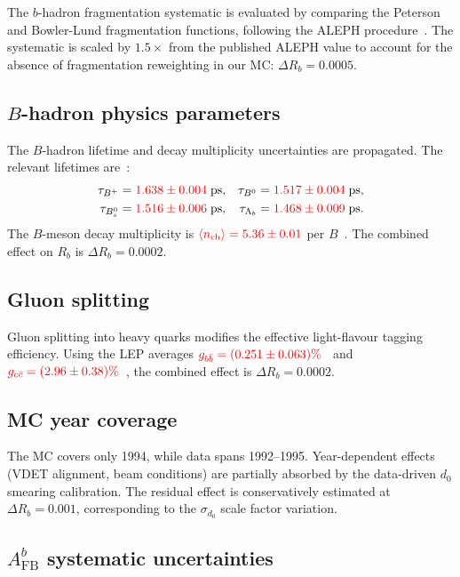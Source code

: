 \documentclass[11pt,a4paper]{article}
\newcommand{\external}[1]{\textcolor{red}{#1}}
\begin{document}
The $b$-hadron fragmentation systematic is evaluated by comparing
the Peterson and Bowler-Lund fragmentation functions, following
the ALEPH procedure~\cite{ALEPH:Rb:1996}.
The systematic is scaled by $1.5\times$ from the published ALEPH
value to account for the absence of fragmentation reweighting in
our MC: $\Delta R_b = 0.0005$.

\subsection{$B$-hadron physics parameters}
\label{sec:syst-physics}

The $B$-hadron lifetime and decay multiplicity uncertainties are
propagated.  The relevant lifetimes are~\cite{PDG:2024}:
\begin{align*}
\tau_{B^+}       &= \external{1.638 \pm 0.004}\;\text{ps}, &
\tau_{B^0}       &= \external{1.517 \pm 0.004}\;\text{ps}, \\
\tau_{B_s^0}     &= \external{1.516 \pm 0.006}\;\text{ps}, &
\tau_{\Lambda_b} &= \external{1.468 \pm 0.009}\;\text{ps}.
\end{align*}
The $B$-meson decay multiplicity is
$\external{\langle n_\text{ch}\rangle = 5.36 \pm 0.01}$
per $B$~\cite{PDG:2024}.
The combined effect on $R_b$ is $\Delta R_b = 0.0002$.

\subsection{Gluon splitting}
\label{sec:syst-gluon}

Gluon splitting into heavy quarks modifies the effective
light-flavour tagging efficiency.
Using the LEP averages
$\external{g_{b\bar{b}} = (0.251 \pm 0.063)\%}$~\cite{ALEPH:gbb}
and $\external{g_{c\bar{c}} = (2.96 \pm 0.38)\%}$~\cite{LEP:gcc},
the combined effect is $\Delta R_b = 0.0002$.

\subsection{MC year coverage}
\label{sec:syst-mc-coverage}

The MC covers only 1994, while data spans 1992--1995.
Year-dependent effects (VDET alignment, beam conditions) are
partially absorbed by the data-driven $d_0$ smearing calibration.
The residual effect is conservatively estimated at
$\Delta R_b = 0.001$, corresponding to the $\sigma_{d_0}$
scale factor variation.

\subsection{$A_\text{FB}^b$ systematic uncertainties}
\label{sec:syst-afb}
\end{document}
